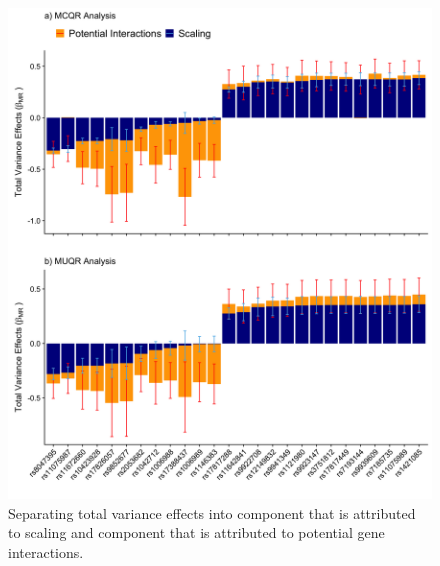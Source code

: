 \documentclass[12pt]{article}
\begin{document}
\begin{figure}[h!]
	\centering
	\includegraphics[width=1\textwidth, height=1\textwidth]{figures/Interaction_vs_Scaling_Variance_Effects.png}
	\caption{Separating total variance effects into component that is attributed to scaling and component that is attributed to potential gene interactions.}
	\label{fig:Interaction_vs_ScalingEffectsSelectSNPs}
\end{figure}
\end{document}
